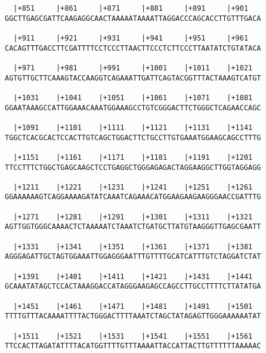 \documentclass{article}
\begin{document}
\begin{Verbatim}
  |+851     |+861     |+871     |+881     |+891     |+901   
GGCTTGAGCGATTCAAGAGGCAACTAAAAATAAAATTAGGACCCAGCACCTTGTTTGACA
                                                            
  |+911     |+921     |+931     |+941     |+951     |+961   
CACAGTTTGACCTTCGATTTTCCTCCCTTAACTTCCCTCTTCCCTTAATATCTGTATACA
                                                            
  |+971     |+981     |+991     |+1001    |+1011    |+1021  
AGTGTTGCTTCAAAGTACCAAGGTCAGAAATTGATTCAGTACGGTTTACTAAAGTCATGT
                                                            
  |+1031    |+1041    |+1051    |+1061    |+1071    |+1081  
GGAATAAAGCCATTGGAAACAAATGGAAAGCCTGTCGGGACTTCTGGGCTCAGAACCAGC
                                                            
  |+1091    |+1101    |+1111    |+1121    |+1131    |+1141  
TGGCTCACGCACTCCACTTGTCAGCTGGACTTCTGCCTTGTGAAATGGAAGCAGCCTTTG
                                                            
  |+1151    |+1161    |+1171    |+1181    |+1191    |+1201  
TTCCTTTCTGGCTGAGCAAGCTCCTGAGGCTGGGAGAGACTAGGAAGGCTTGGTAGGAGG
                                                            
  |+1211    |+1221    |+1231    |+1241    |+1251    |+1261  
GGAAAAAAGTCAGGAAAAGATATCAAATCAGAAACATGGAAGAAGAAGGGAACCGATTTG
                                                            
  |+1271    |+1281    |+1291    |+1301    |+1311    |+1321  
AGTTGGTGGGCAAAACTCTAAAAATCTAAATCTGATGCTTATGTAAGGGTTGAGCGAATT
                                                            
  |+1331    |+1341    |+1351    |+1361    |+1371    |+1381  
AGGGAGATTGCTAGTGGAAATTGGAGGGAATTTGTTTTGCATCATTTGTCTAGGATCTAT
                                                            
  |+1391    |+1401    |+1411    |+1421    |+1431    |+1441  
GCAAATATAGCTCCACTAAAGGACCATAGGGAAGAGCCAGCCTTGCCTTTTCTTATATGA
                                                            
  |+1451    |+1461    |+1471    |+1481    |+1491    |+1501  
TTTTGTTTACAAAATTTTACTGGGACTTTTAAATCTAGCTATAGAGTTGGGAAAAAATAT
                                                            
  |+1511    |+1521    |+1531    |+1541    |+1551    |+1561  
TTCCACTTAGATATTTTACATGGTTTTGTTTAAAATTACCATTACTTGTTTTTTAAAAAC
                                                            

\end{Verbatim}
\end{document}
